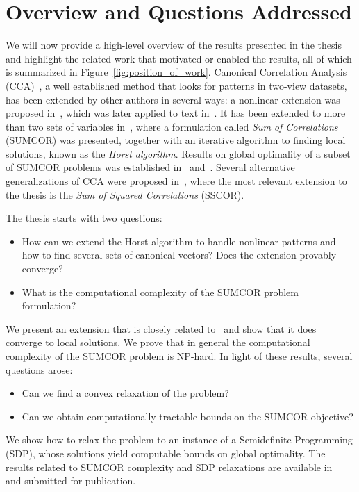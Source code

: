 \section{Overview and Questions Addressed}

We will now provide a high-level overview of the results presented in the thesis and highlight the related work
that motivated or enabled the results, all of which is summarized in Figure~\ref{fig:position_of_work}.
Canonical Correlation Analysis (CCA)~\cite{Hotelling}, a well established method that looks for patterns in two-view
datasets, has been extended by other authors in several ways: a nonlinear extension was proposed in~\cite{FBMJ}, which
was later applied to text in~\cite{vinokourov2002inferring}. It has been extended to more than two sets of variables
in~\cite{Horst}, where a formulation called \emph{Sum of Correlations} (SUMCOR) was presented, together with an iterative
algorithm to finding local solutions, known as the \emph{Horst algorithm}. Results on global optimality of a subset
of SUMCOR problems was established in~\cite{GlobalMEP} and~\cite{GlobalMEP2}. Several alternative generalizations
of CCA were proposed in~\cite{Kettenring}, where the most relevant extension to the thesis is the
\emph{Sum of Squared Correlations} (SSCOR).

The thesis starts with two questions:
\begin{itemize}
\item How can we extend the Horst algorithm to handle nonlinear patterns and how to find several sets of canonical vectors? Does the extension provably converge?
\item What is the computational complexity of the SUMCOR problem formulation?
\end{itemize}
We present an extension that is closely related to~\cite{FBMJ} and show that it does converge to local solutions. We prove that in
general the computational complexity of the SUMCOR problem is NP-hard.
 In light of these results, several questions arose:
\begin{itemize}
\item Can we find a convex relaxation of the problem?
\item Can we obtain computationally tractable bounds on the SUMCOR objective?
\end{itemize}
We show how to relax the problem to an instance of a Semidefinite Programming (SDP), whose solutions yield
computable bounds on global optimality. The results related to SUMCOR complexity and SDP relaxations
are available in~\cite{DBLP:journals/corr/abs-1302-0974} and submitted for publication.

